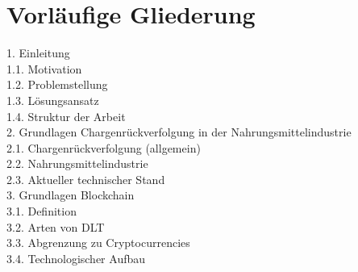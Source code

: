 \section{Vorläufige Gliederung}
\begin{small}
	1. Einleitung\\
	\noindent\hspace*{10mm}%
	1.1. Motivation\\
	\noindent\hspace*{10mm}%
	1.2. Problemstellung\\
	\noindent\hspace*{10mm}%
	1.3. Lösungsansatz\\
	\noindent\hspace*{10mm}%
	1.4. Struktur der Arbeit\\
	2. Grundlagen Chargenrückverfolgung in der Nahrungsmittelindustrie\\
	\noindent\hspace*{10mm}%
	2.1. Chargenrückverfolgung (allgemein)\\
	\noindent\hspace*{10mm}%
	2.2. Nahrungsmittelindustrie\\
	\noindent\hspace*{10mm}%
	2.3. Aktueller technischer Stand\\
	3. Grundlagen Blockchain\\
	\noindent\hspace*{10mm}%
	3.1. Definition\\
	\noindent\hspace*{10mm}%
	3.2. Arten von DLT\\
	\noindent\hspace*{10mm}%
	3.3. Abgrenzung zu Cryptocurrencies\\
	\noindent\hspace*{10mm}%
	3.4. Technologischer Aufbau\\

\end{small}
